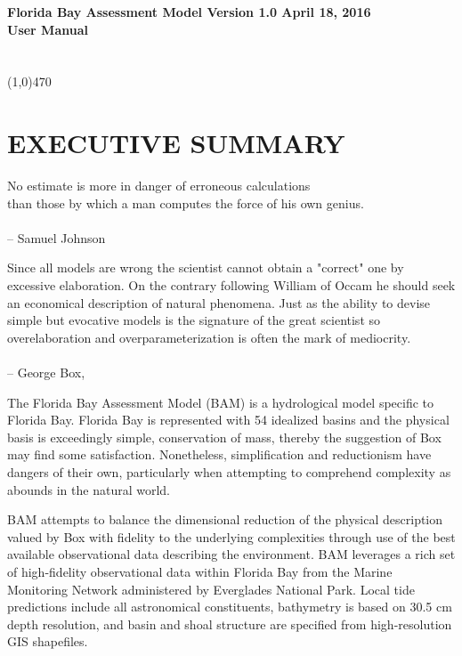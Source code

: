 \sffamily
\Large
\noindent\textbf{Florida Bay Assessment Model Version 1.0 April 18, 2016}
\\[0.1in]
\noindent\textbf{User Manual}
\\[0.1in]
\normalsize
{}
\\[0.05in]
\\[0.1in]
\noindent\line(1,0){470}

\section*{EXECUTIVE SUMMARY}
\rmfamily
\large

No estimate is more in danger of erroneous calculations\\
than those by which a man computes the force of his own genius.\\
\\-- Samuel Johnson

Since all models are wrong the scientist cannot obtain a "correct" one by excessive elaboration. On the contrary following William of Occam he should seek an economical description of natural phenomena. Just as the ability to devise simple but evocative models is the signature of the great scientist so overelaboration and overparameterization is often the mark of mediocrity.\\
\\-- George Box, \citep{Box1976}

The Florida Bay Assessment Model (BAM) is a hydrological model specific to Florida Bay.  Florida Bay is represented with 54 idealized basins and the physical basis is exceedingly simple, conservation of mass, thereby the suggestion of Box may find some satisfaction.  Nonetheless, simplification and reductionism have dangers of their own, particularly when attempting to comprehend complexity as abounds in the natural world.

BAM attempts to balance the dimensional reduction of the physical description valued by Box with fidelity to the underlying complexities through use of the best available observational data describing the environment.  BAM leverages a rich set of high-fidelity observational data within Florida Bay from the Marine Monitoring Network administered by Everglades National Park.  Local tide predictions include all astronomical constituents, bathymetry is based on 30.5 cm depth resolution, and basin and shoal structure are specified from high-resolution GIS shapefiles. 

